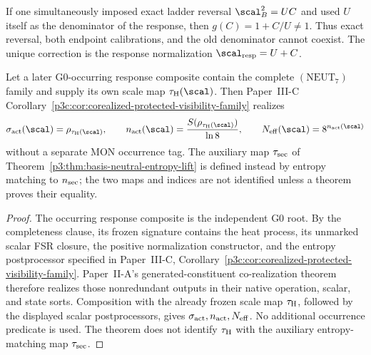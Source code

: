 \documentclass[11pt,a4paper]{article}
\begin{document}
\begin{remark}
If one simultaneously imposed exact ladder reversal
\(\scal_B^2=UC\) and used \(U\) itself as the denominator of the response,
then \(g(C)=1+C/U\ne1\).  Thus exact reversal, both endpoint calibrations,
and the old denominator cannot coexist.  The unique correction is the
response normalization \(\scal_{\rm resp}=U+C\).
\end{remark}
\begin{corollary}
\label{p3d:cor:forward-entropy-transport}
Let a later G0-occurring response composite contain the complete
\((\mathrm{NEUT}_7)\) family and supply its own scale map
\(\tau_{\rm H}(\scal)\).  Then Paper~III-C
Corollary~\ref{p3c:cor:corealized-protected-visibility-family} realizes
\[
 \sigma_{\rm act}(\scal)=\rho_{\tau_{\rm H}(\scal)},\qquad
 n_{\rm act}(\scal)
 =\frac{S(\rho_{\tau_{\rm H}(\scal)})}{\ln8},\qquad
 N_{\rm eff}(\scal)=8^{n_{\rm act}(\scal)}
\]
without a separate MON occurrence tag.  The auxiliary map
\(\tau_{\rm sec}\) of
Theorem~\ref{p3:thm:basis-neutral-entropy-lift} is defined instead by entropy
matching to \(n_{\rm sec}\); the two maps and indices are not identified unless
a theorem proves their equality.
\end{corollary}

\begin{proof}
The occurring response composite is the independent G0 root.  By the
completeness clause, its frozen signature contains the heat process, its
unmarked scalar FSR closure, the positive normalization constructor, and the
entropy postprocessor specified in Paper~III-C,
Corollary~\ref{p3c:cor:corealized-protected-visibility-family}.
Paper~II-A's generated-constituent co-realization theorem therefore realizes
those nonredundant outputs in their native operation, scalar, and state sorts.
Composition with the already frozen scale map \(\tau_{\rm H}\), followed by
the displayed scalar postprocessors, gives
\(\sigma_{\rm act},n_{\rm act},N_{\rm eff}\).  No additional occurrence
predicate is used.  The theorem does not identify \(\tau_{\rm H}\) with the
auxiliary entropy-matching map \(\tau_{\rm sec}\).
\end{proof}
\end{document}
